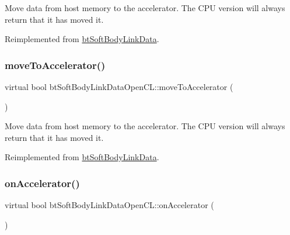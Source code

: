 Move data from host memory to the accelerator. The C\+PU version will always return that it has moved it. 

Reimplemented from \hyperlink{classbtSoftBodyLinkData_a6cce268f804d465f3bc998771d3a7433}{bt\+Soft\+Body\+Link\+Data}.

\mbox{\label{classbtSoftBodyLinkDataOpenCL_a5e820163521c0848b6b4f025add87213}} 
\subsubsection{\texorpdfstring{move\+To\+Accelerator()}{moveToAccelerator()}\hspace{0.1cm}{\footnotesize\ttfamily [2/2]}}
{\footnotesize\ttfamily virtual bool bt\+Soft\+Body\+Link\+Data\+Open\+C\+L\+::move\+To\+Accelerator (\begin{DoxyParamCaption}{ }\end{DoxyParamCaption})\hspace{0.3cm}{\ttfamily [virtual]}}

Move data from host memory to the accelerator. The C\+PU version will always return that it has moved it. 

Reimplemented from \hyperlink{classbtSoftBodyLinkData_a6cce268f804d465f3bc998771d3a7433}{bt\+Soft\+Body\+Link\+Data}.

\mbox{\label{classbtSoftBodyLinkDataOpenCL_a6cd4ec2a4127d48feff5c2cb46be5d52}} 
\subsubsection{\texorpdfstring{on\+Accelerator()}{onAccelerator()}\hspace{0.1cm}{\footnotesize\ttfamily [1/2]}}
{\footnotesize\ttfamily virtual bool bt\+Soft\+Body\+Link\+Data\+Open\+C\+L\+::on\+Accelerator (\begin{DoxyParamCaption}{ }\end{DoxyParamCaption})\hspace{0.3cm}{\ttfamily [virtual]}}

